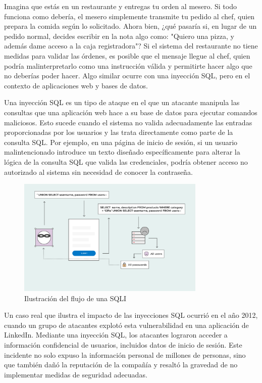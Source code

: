 \documentclass[a4paper,12pt]{article}
\begin{document}
 Imagina que estás en un restaurante y entregas tu orden al mesero. Si todo funciona como debería, el mesero simplemente transmite tu pedido al chef, quien prepara la comida según lo solicitado. Ahora bien, ¿qué pasaría si, en lugar de un pedido normal, decides escribir en la nota algo como: "Quiero una pizza, y además dame acceso a la caja registradora"? Si el sistema del restaurante no tiene medidas para validar las órdenes, es posible que el mensaje llegue al chef, quien podría malinterpretarlo como una instrucción válida y permitirte hacer algo que no deberías poder hacer. Algo similar ocurre con una inyección SQL, pero en el contexto de aplicaciones web y bases de datos.
 \vspace{0,5cm}

 Una inyección SQL es un tipo de ataque en el que un atacante manipula las consultas que una aplicación web hace a su base de datos para ejecutar comandos maliciosos. Esto sucede cuando el sistema no valida adecuadamente las entradas proporcionadas por los usuarios y las trata directamente como parte de la consulta SQL. Por ejemplo, en una página de inicio de sesión, si un usuario malintencionado introduce un texto diseñado específicamente para alterar la lógica de la consulta SQL que valida las credenciales, podría obtener acceso no autorizado al sistema sin necesidad de conocer la contraseña.
 \vspace{0,5cm}

 \begin{figure}[H]
    \centering
    \includegraphics[width=0.8\textwidth]{Imagenes/ejemploSQL.png}
    \caption{Ilustración del flujo de una SQLI}
\end{figure}

\vspace{0,5cm}


 Un caso real que ilustra el impacto de las inyecciones SQL ocurrió en el año 2012, cuando un grupo de atacantes explotó esta vulnerabilidad en una aplicación de LinkedIn. Mediante una inyección SQL, los atacantes lograron acceder a información confidencial de usuarios, incluidos datos de inicio de sesión. Este incidente no solo expuso la información personal de millones de personas, sino que también dañó la reputación de la compañía y resaltó la gravedad de no implementar medidas de seguridad adecuadas.
 \vspace{0,5cm}
\end{document}
